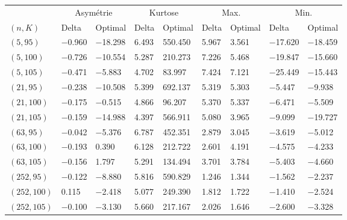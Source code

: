 \begin{tabular}{lllllllll}
\toprule
& \multicolumn{2}{c}{Asymétrie} & \multicolumn{2}{c}{Kurtose} & \multicolumn{2}{c}{Max.} & \multicolumn{2}{c}{Min.}\\
$(n,K)$& Delta & Optimal & Delta & Optimal & Delta & Optimal & Delta & Optimal\\
\midrule
$(5,95)$ & \num{-0.960} & \num{-18.298} & \num{6.493} & \num{550.450} & \num{5.967} & \num{3.561} & \num{-17.620} & \num{-18.459}\\
$(5,100)$ & \num{-0.726} & \num{-10.554} & \num{5.287} & \num{210.273} & \num{7.226} & \num{5.468} & \num{-19.847} & \num{-15.660}\\
$(5,105)$ & \num{-0.471} & \num{-5.883} & \num{4.702} & \num{83.997} & \num{7.424} & \num{7.121} & \num{-25.449} & \num{-15.443}\\
$(21,95)$ & \num{-0.238} & \num{-10.508} & \num{5.399} & \num{692.137} & \num{5.319} & \num{5.303} & \num{-5.447} & \num{-9.938}\\
$(21,100)$ & \num{-0.175} & \num{-0.515} & \num{4.866} & \num{96.207} & \num{5.370} & \num{5.337} & \num{-6.471} & \num{-5.509}\\
$(21,105)$ & \num{-0.159} & \num{-14.988} & \num{4.397} & \num{566.911} & \num{5.080} & \num{3.965} & \num{-9.099} & \num{-19.727}\\
$(63,95)$ & \num{-0.042} & \num{-5.376} & \num{6.787} & \num{452.351} & \num{2.879} & \num{3.045} & \num{-3.619} & \num{-5.012}\\
$(63,100)$ & \num{-0.193} & \num{0.390} & \num{6.128} & \num{212.722} & \num{2.601} & \num{4.191} & \num{-4.575} & \num{-4.233}\\
$(63,105)$ & \num{-0.156} & \num{1.797} & \num{5.291} & \num{134.494} & \num{3.701} & \num{3.784} & \num{-5.403} & \num{-4.660}\\
$(252,95)$ & \num{-0.122} & \num{-8.880} & \num{5.816} & \num{590.829} & \num{1.246} & \num{1.344} & \num{-1.562} & \num{-2.237}\\
$(252,100)$ & \num{0.115} & \num{-2.418} & \num{5.077} & \num{249.390} & \num{1.812} & \num{1.722} & \num{-1.410} & \num{-2.524}\\
$(252,105)$ & \num{-0.100} & \num{-3.130} & \num{5.660} & \num{217.167} & \num{2.026} & \num{1.646} & \num{-2.600} & \num{-3.328}\\
\bottomrule
\end{tabular}